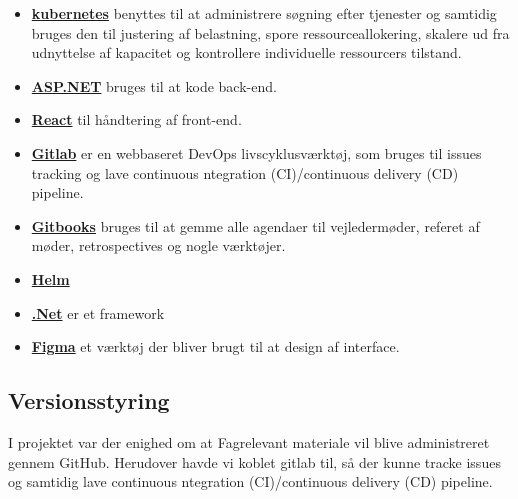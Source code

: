\begin{itemize}
    \item \underline{\textbf{ kubernetes}} benyttes til at administrere søgning efter tjenester og samtidig bruges den til justering af belastning, spore ressourceallokering, skalere ud fra udnyttelse af kapacitet og kontrollere individuelle ressourcers tilstand.
    \item \underline{\textbf{ ASP.NET}} bruges til at kode back-end.
    \item \underline{\textbf{ React}} til håndtering af front-end.
    \item \underline{\textbf{ Gitlab}} er en webbaseret DevOps livscyklusværktøj, som bruges til issues tracking og lave continuous ntegration (CI)/continuous delivery (CD) pipeline. 
    \item \underline{\textbf{ Gitbooks}} bruges til at gemme alle agendaer til vejledermøder, referet af møder, retrospectives og nogle værktøjer.
    \item \underline{\textbf{ Helm}}
    \item \underline{\textbf{ .Net}} er et framework
    \item \underline{\textbf{ Figma}} et værktøj der bliver brugt til at design af interface.
   
  
\end{itemize}


\subsection{Versionsstyring}
I projektet var der enighed om at Fagrelevant materiale vil blive administreret gennem GitHub. Herudover havde vi koblet gitlab til, så der kunne tracke issues og samtidig lave continuous ntegration (CI)/continuous delivery (CD) pipeline.



